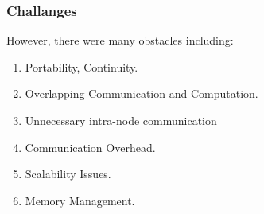 \begin{frame}
  \frametitle{Challanges}
  However, there were many obstacles including:
  \begin{enumerate}
    \item Portability, Continuity.
    \item Overlapping Communication and Computation.
    \item Unnecessary intra-node communication
    \item Communication Overhead.
    \item Scalability Issues.
    \item Memory Management.
  \end{enumerate}    
\end{frame}
